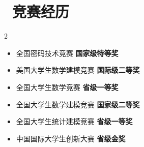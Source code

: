 \documentclass[8pt]{resume}
\begin{document}
\section{\faUsers\ 竞赛经历}
\vspace{-1em}
\begin{multicols}{2}
\begin{itemize}
    \item 全国密码技术竞赛 \textbf{国家级特等奖}
    \item 美国大学生数学建模竞赛 \textbf{国际级二等奖}
    \item 全国大学生数学竞赛 \textbf{省级一等奖}
    \item 全国大学生数学建模竞赛 \textbf{国家级二等奖}
    \item 全国大学生统计建模竞赛 \textbf{省级一等奖}
    \item 中国国际大学生创新大赛 \textbf{省级金奖}
    \end{itemize}
\end{multicols}
\vspace{-1em}






\end{document}
